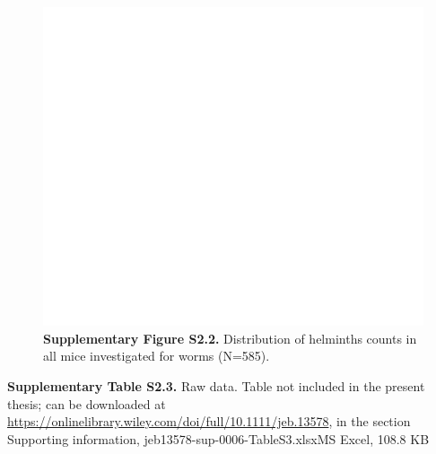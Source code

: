 \begin{figure}[H]
	\centering
	\includegraphics[width=\linewidth,height=\textheight,keepaspectratio]{images/2article1/SupplementaryFigureS2.pdf}
	\captionsetup{labelformat=empty}
	\caption{\textbf{Supplementary Figure S2.2.} Distribution of helminths counts in all mice investigated for worms (N=585).}
\end{figure}

\vspace{2cm}

\textbf{Supplementary Table S2.3.} Raw data. Table not included in the present thesis; can be downloaded at \url{https://onlinelibrary.wiley.com/doi/full/10.1111/jeb.13578}, in the section Supporting information, jeb13578-sup-0006-TableS3.xlsxMS Excel, 108.8 KB

\newpage

